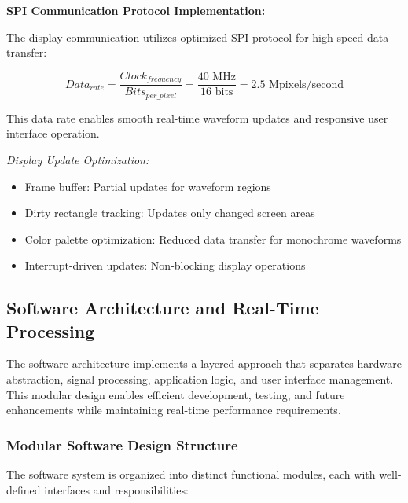 \documentclass[12pt,a4paper]{article}
\begin{document}
\vspace{0.5cm}

\textbf{SPI Communication Protocol Implementation:}

The display communication utilizes optimized SPI protocol for high-speed data transfer:

\begin{equation*}
Data_{rate} = \frac{Clock_{frequency}}{Bits_{per\_pixel}} = \frac{40 \text{ MHz}}{16 \text{ bits}} = 2.5 \text{ Mpixels/second}
\end{equation*}

This data rate enables smooth real-time waveform updates and responsive user interface operation.

\vspace{0.3cm}

\textit{Display Update Optimization:}
\begin{itemize}
\item Frame buffer: Partial updates for waveform regions
\item Dirty rectangle tracking: Updates only changed screen areas
\item Color palette optimization: Reduced data transfer for monochrome waveforms
\item Interrupt-driven updates: Non-blocking display operations
\end{itemize}

\subsection{Software Architecture and Real-Time Processing}

The software architecture implements a layered approach that separates hardware abstraction, signal processing, application logic, and user interface management. This modular design enables efficient development, testing, and future enhancements while maintaining real-time performance requirements.

\subsubsection{Modular Software Design Structure}

The software system is organized into distinct functional modules, each with well-defined interfaces and responsibilities:

\vspace{0.5cm}

\end{document}

